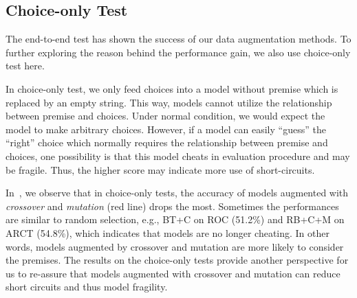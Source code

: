 


\subsection{Choice-only Test}

The end-to-end test has shown the success of our data augmentation 
methods. To further exploring the reason behind the performance gain, 
we also use choice-only test here.

In choice-only test, we only feed choices into a model without premise which is replaced 
by an empty string. This way, 
models cannot utilize the relationship between premise and choices. 
Under normal condition, we would expect the model to make arbitrary choices.
However, if a model can easily ``guess'' the ``right'' choice which 
normally requires the relationship between premise and choices,  
one possibility is that this model cheats in evaluation procedure and 
may be fragile. Thus, the higher score may indicate more use of short-circuits.

In~, we observe that in choice-only tests,
the accuracy of models augmented with \textit{crossover} and \textit{mutation} 
(red line) drops the most. 
Sometimes the performances are similar to random selection, e.g., 
BT+C on ROC (51.2\%) and RB+C+M on ARCT (54.8\%), which indicates that models 
are no longer cheating. 
In other words, models augmented by crossover and mutation 
are more likely to consider the premises. 
The results on the choice-only tests provide another perspective for us
to re-assure that models augmented with crossover and mutation can reduce
short circuits and thus model fragility.


